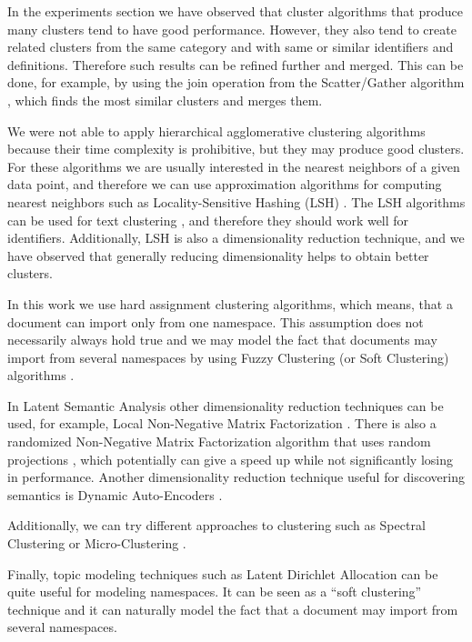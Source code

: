 In the experiments section we have observed that cluster algorithms that produce
many clusters tend to have good performance. However, they also tend to create related
clusters from the same category and with same or similar identifiers and
definitions. Therefore such results can be refined further and merged.
This can be done, for example, by using the join operation from
the Scatter/Gather algorithm \cite{cutting1992scatter}, which finds the most
similar clusters and merges them.

We were not able to apply hierarchical agglomerative clustering algorithms because
their time complexity is prohibitive, but they may produce good clusters.
For these algorithms we are usually interested in the nearest neighbors of a given
data point, and therefore we can use approximation algorithms for computing nearest
neighbors such as Locality-Sensitive Hashing (LSH) \cite{leskovec2014mining}.
The LSH algorithms can be used for text clustering \cite{ravichandran2005randomized},
and therefore they should work well for identifiers. Additionally, LSH is also a
dimensionality reduction technique, and we have observed that generally
reducing dimensionality helps to obtain better clusters.

In this work we use hard assignment clustering algorithms, which means, that a document
can import only from one namespace. This assumption does not necessarily always hold true
and we may model the fact that documents may import from several namespaces by
using Fuzzy Clustering (or Soft Clustering) algorithms \cite{baraldi1999survey}.

In Latent Semantic Analysis other dimensionality reduction techniques
can be used, for example, Local Non-Negative Matrix Factorization \cite{li2001learning}.
There is also a randomized Non-Negative Matrix Factorization algorithm that uses
random projections \cite{wang2010efficient} \cite{damle2014random},
which potentially can give a speed up while not significantly losing
in performance. Another dimensionality reduction technique useful for
discovering semantics is Dynamic Auto-Encoders \cite{mirowski2010dynamic}.

Additionally, we can try different approaches to clustering such as
Spectral Clustering \cite{ng2002spectral} or Micro-Clustering \cite{uno2015micro}.

Finally, topic modeling techniques such as Latent Dirichlet Allocation
\cite{blei2003latent} can be quite useful for modeling namespaces. It can be
seen as a ``soft clustering'' technique and it can naturally model the fact that
a document may import from several namespaces.


